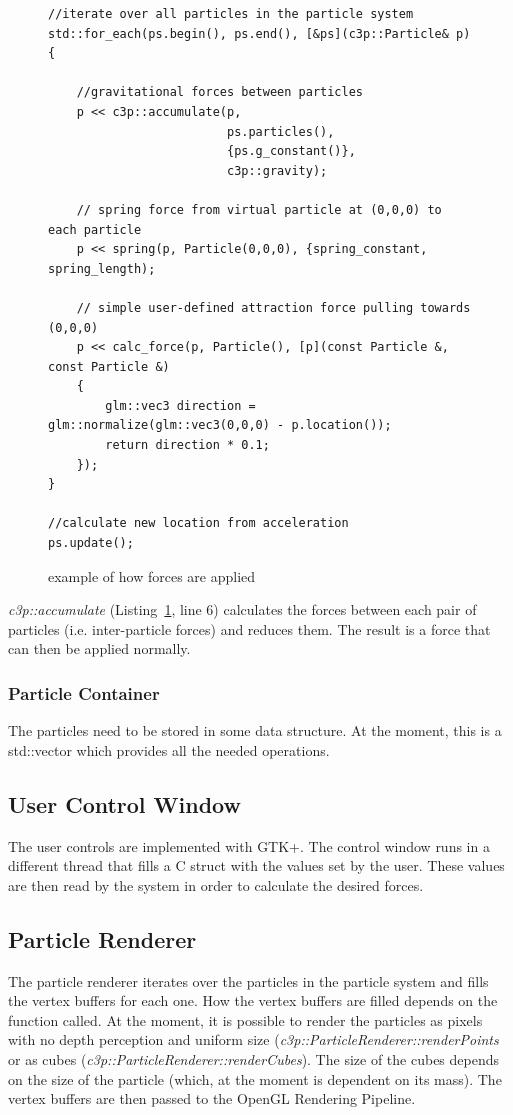 \documentclass[runningheads,a4paper]{llncs}
\begin{document}
\begin{figure}[tb]
\begin{lstlisting}
//iterate over all particles in the particle system
std::for_each(ps.begin(), ps.end(), [&ps](c3p::Particle& p)
{

  	//gravitational forces between particles
	p << c3p::accumulate(p,
						 ps.particles(),
						 {ps.g_constant()},
    					 c3p::gravity);
    					 
	// spring force from virtual particle at (0,0,0) to each particle
	p << spring(p, Particle(0,0,0), {spring_constant, spring_length);

	// simple user-defined attraction force pulling towards (0,0,0)
	p << calc_force(p, Particle(), [p](const Particle &, const Particle &)
	{
    	glm::vec3 direction = glm::normalize(glm::vec3(0,0,0) - p.location());
		return direction * 0.1;
    });
}          

//calculate new location from acceleration
ps.update();     
\end{lstlisting}
 \caption{example of how forces are applied}
 \label{fig:main}
\end{figure}

\emph{c3p::accumulate} (Listing~\ref{fig:main}, line 6) calculates the forces between each pair of particles (i.e. inter-particle forces) and reduces them. The result is a force that can then be applied normally.


\subsubsection{Particle Container}
The particles need to be stored in some data structure. At the moment, this is a std::vector which provides all the needed operations.

\subsection{User Control Window}
The user controls are implemented with GTK+\cite{gtk}. The control window runs in a different thread that fills a C struct with the values set by the user. These values are then read by the system in order to calculate the desired forces.

\subsection{Particle Renderer}
The particle renderer iterates over the particles in the particle system and fills the vertex buffers for each one. How the vertex buffers are filled depends on the function called. At the moment, it is possible to render the particles as pixels with no depth perception and uniform size (\emph{c3p::ParticleRenderer::renderPoints}
or as cubes (\emph{c3p::ParticleRenderer::renderCubes}). The size of the cubes depends on the size of the particle (which, at the moment is dependent on its mass). The vertex buffers are then passed to the OpenGL Rendering Pipeline.
\end{document}
